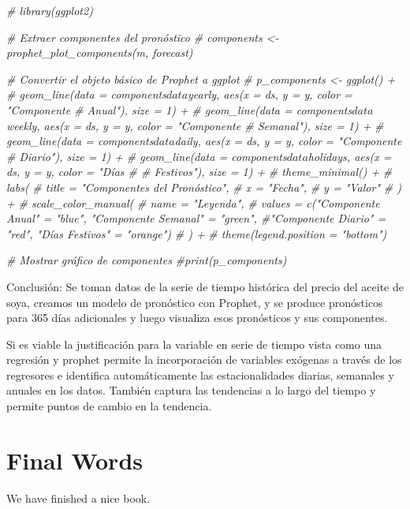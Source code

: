 \documentclass[
]{book}
\newenvironment{Shaded}{\begin{snugshade}}{\end{snugshade}}
\newcommand{\CommentTok}[1]{\textcolor[rgb]{0.56,0.35,0.01}{\textit{#1}}}
\begin{document}
\begin{Shaded}
\begin{Highlighting}[]
\CommentTok{\# library(ggplot2)}

\CommentTok{\# Extraer componentes del pronóstico}
\CommentTok{\# components \textless{}{-} prophet\_plot\_components(m, forecast)}

\CommentTok{\# Convertir el objeto básico de Prophet a ggplot}
\CommentTok{\# p\_components \textless{}{-} ggplot() +}
\CommentTok{\#  geom\_line(data = components$data$yearly, aes(x = ds, y = y, color = "Componente \# Anual"), size = 1) +}
\CommentTok{\#  geom\_line(data = components$data$weekly, aes(x = ds, y = y, color = "Componente \# Semanal"), size = 1) +}
\CommentTok{\#  geom\_line(data = components$data$daily, aes(x = ds, y = y, color = "Componente \# Diario"), size = 1) +}
\CommentTok{\#  geom\_line(data = components$data$holidays, aes(x = ds, y = y, color = "Días \# \# Festivos"), size = 1) +}
\CommentTok{\#  theme\_minimal() +}
\CommentTok{\#  labs(}
\CommentTok{\#    title = "Componentes del Pronóstico",}
\CommentTok{\#    x = "Fecha",}
\CommentTok{\#    y = "Valor"}
\CommentTok{\#  ) +}
\CommentTok{\#  scale\_color\_manual(}
\CommentTok{\#    name = "Leyenda",}
\CommentTok{\#    values = c("Componente Anual" = "blue", "Componente Semanal" = "green", \#"Componente Diario" = "red", "Días Festivos" = "orange")}
\CommentTok{\#  ) +}
\CommentTok{\#  theme(legend.position = "bottom")}

\CommentTok{\# Mostrar gráfico de componentes}
\CommentTok{\#print(p\_components)}
\end{Highlighting}
\end{Shaded}

Conclusión: Se toman datos de la serie de tiempo histórica del precio del aceite de soya, creamos un modelo de pronóstico con Prophet, y se produce pronósticos para 365 días adicionales y luego visualiza esos pronósticos y sus componentes.

Si es viable la justificación para la variable en serie de tiempo vista como una regresión y prophet permite la incorporación de variables exógenas a través de los regresores e identifica automáticamente las estacionalidades diarias, semanales y anuales en los datos. También captura las tendencias a lo largo del tiempo y permite puntos de cambio en la tendencia.

\hypertarget{final-words}{%
\chapter{Final Words}\label{final-words}}

We have finished a nice book.

  
\end{document}
